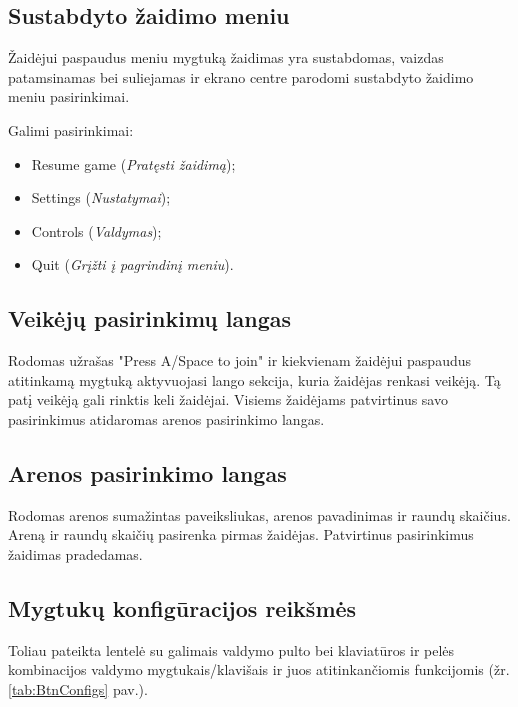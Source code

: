 \documentclass{VUMIFPSkursinis}
\begin{document}
\subsection{Sustabdyto žaidimo meniu}
Žaidėjui paspaudus meniu mygtuką žaidimas yra sustabdomas, vaizdas patamsinamas bei suliejamas ir ekrano centre parodomi sustabdyto žaidimo meniu pasirinkimai.\newline

Galimi pasirinkimai:
\begin{itemize}
    \item Resume game (\textit{Pratęsti žaidimą});
    \item Settings (\textit{Nustatymai});
    \item Controls (\textit{Valdymas});
    \item Quit (\textit{Grįžti į pagrindinį meniu}).
\end{itemize}


\subsection{Veikėjų pasirinkimų langas}
Rodomas užrašas "Press A/Space to join" ir kiekvienam žaidėjui paspaudus atitinkamą mygtuką aktyvuojasi lango sekcija, kuria žaidėjas renkasi veikėją. Tą patį veikėją gali rinktis keli žaidėjai. Visiems žaidėjams patvirtinus savo pasirinkimus atidaromas arenos pasirinkimo langas.

\subsection{Arenos pasirinkimo langas}
Rodomas arenos sumažintas paveiksliukas, arenos pavadinimas ir raundų skaičius. Areną ir raundų skaičių pasirenka pirmas žaidėjas. Patvirtinus pasirinkimus žaidimas pradedamas.


\subsection{Mygtukų konfigūracijos reikšmės}
Toliau pateikta lentelė su galimais valdymo pulto bei   klaviatūros ir pelės kombinacijos valdymo mygtukais/klavišais ir juos atitinkančiomis funkcijomis (žr. \ref{tab:BtnConfigs} pav.).
\end{document}
